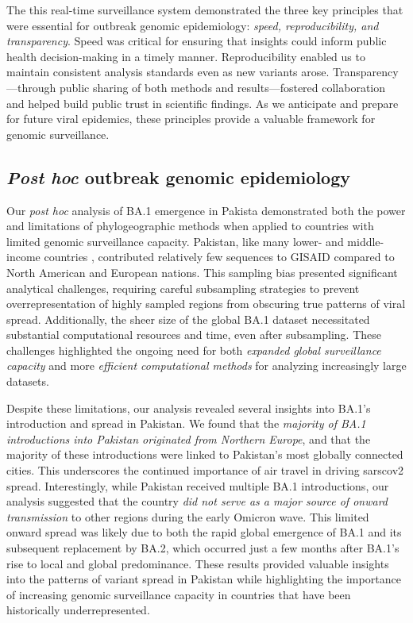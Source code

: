 The this real-time surveillance system demonstrated the three key principles that were essential for outbreak genomic epidemiology: \textit{speed, reproducibility, and transparency}.
Speed was critical for ensuring that insights could inform public health decision-making in a timely manner.
Reproducibility enabled us to maintain consistent analysis standards even as new variants arose.
Transparency---through public sharing of both methods and results---fostered collaboration and helped build public trust in scientific findings.
As we anticipate and prepare for future viral epidemics, these principles provide a valuable framework for genomic surveillance.

\subsection{\textit{Post hoc} outbreak genomic epidemiology}
Our \textit{post hoc} analysis of BA.1 emergence in Pakista demonstrated both the power and limitations of phylogeographic methods when applied to countries with limited genomic surveillance capacity.
Pakistan, like many lower- and middle-income countries \citep{brito2022global}, contributed relatively few sequences to GISAID compared to North American and European nations.
This sampling bias presented significant analytical challenges, requiring careful subsampling strategies to prevent overrepresentation of highly sampled regions from obscuring true patterns of viral spread.
Additionally, the sheer size of the global BA.1 dataset necessitated substantial computational resources and time, even after subsampling.
These challenges highlighted the ongoing need for both \textit{expanded global surveillance capacity} and more \textit{efficient computational methods} for analyzing increasingly large datasets.

Despite these limitations, our analysis revealed several insights into BA.1's introduction and spread in Pakistan.
We found that the \textit{majority of BA.1 introductions into Pakistan originated from Northern Europe}, and that the majority of these introductions were linked to Pakistan's most globally connected cities.
This underscores the continued importance of air travel in driving \gls{sarscov2} spread.
Interestingly, while Pakistan received multiple BA.1 introductions, our analysis suggested that the country \textit{did not serve as a major source of onward transmission} to other regions during the early Omicron wave.
This limited onward spread was likely due to both the rapid global emergence of BA.1 and its subsequent replacement by BA.2, which occurred just a few months after BA.1's rise to local and global predominance.
These results provided valuable insights into the patterns of variant spread in Pakistan while highlighting the importance of increasing genomic surveillance capacity in countries that have been historically underrepresented.

